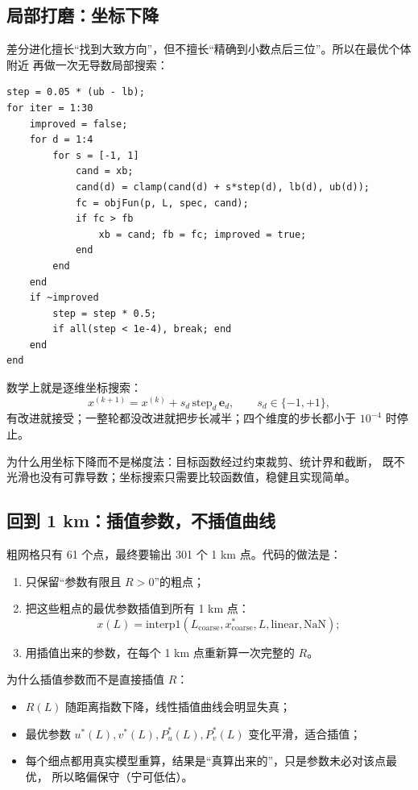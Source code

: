 \documentclass[UTF8,11pt,a4paper]{ctexart}
\begin{document}
\subsection{局部打磨：坐标下降}

差分进化擅长“找到大致方向”，但不擅长“精确到小数点后三位”。所以在最优个体附近
再做一次无导数局部搜索：
\begin{lstlisting}
step = 0.05 * (ub - lb);
for iter = 1:30
    improved = false;
    for d = 1:4
        for s = [-1, 1]
            cand = xb;
            cand(d) = clamp(cand(d) + s*step(d), lb(d), ub(d));
            fc = objFun(p, L, spec, cand);
            if fc > fb
                xb = cand; fb = fc; improved = true;
            end
        end
    end
    if ~improved
        step = step * 0.5;
        if all(step < 1e-4), break; end
    end
end
\end{lstlisting}

数学上就是逐维坐标搜索：
\begin{equation}
x^{(k+1)}=x^{(k)}+s_d\,\mathrm{step}_d\,\mathbf{e}_d,
\qquad s_d\in\{-1,+1\},
\end{equation}
有改进就接受；一整轮都没改进就把步长减半；四个维度的步长都小于 $10^{-4}$ 时停止。

为什么用坐标下降而不是梯度法：目标函数经过约束裁剪、统计界和截断，
既不光滑也没有可靠导数；坐标搜索只需要比较函数值，稳健且实现简单。

\subsection{回到 1 km：插值参数，不插值曲线}

粗网格只有 61 个点，最终要输出 301 个 1 km 点。代码的做法是：
\begin{enumerate}[leftmargin=1.8em]
\item 只保留“参数有限且 $R>0$”的粗点；
\item 把这些粗点的最优参数插值到所有 1 km 点：
\begin{equation}
x(L)=\mathrm{interp1}\!\left(L_{\text{coarse}},x^*_{\text{coarse}},L,
\text{linear},\mathrm{NaN}\right);
\end{equation}
\item 用插值出来的参数，在每个 1 km 点重新算一次完整的 $R$。
\end{enumerate}

为什么插值参数而不是直接插值 $R$：
\begin{itemize}[leftmargin=1.6em]
\item $R(L)$ 随距离指数下降，线性插值曲线会明显失真；
\item 最优参数 $u^*(L),v^*(L),P_u^*(L),P_v^*(L)$ 变化平滑，适合插值；
\item 每个细点都用真实模型重算，结果是“真算出来的”，只是参数未必对该点最优，
      所以略偏保守（宁可低估）。
\end{itemize}
\end{document}
